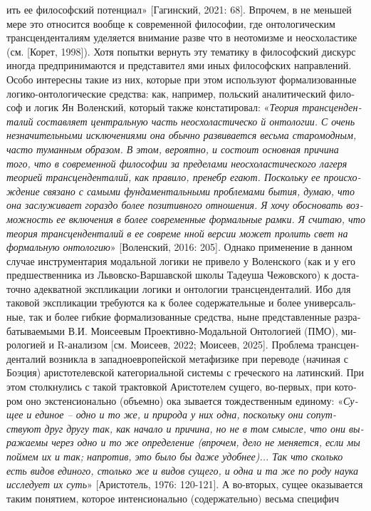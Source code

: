 \begin{russian}
{{    ить ее философский потенциал}» [Гагинский, 2021: 68]. 
    Впрочем, в не меньшей мере это относится вообще к современной философии, где онтологическим трансценденталиям уделяется внимание разве что в неотомизме и неосхоластике (см. [Корет, 1998]). Хотя попытки вернуть эту тематику в философский дискурс иногда предпринимаются и представител
    ями иных философских направлений. 
    Особо интересны такие из них, которые при этом используют формализованные логико-онтологические средства: как, например, польский аналитический философ и логик Ян Воленский, который также констатировал: «\textit{Теория трансценденталий составляет центральную часть неосхоластическо
    й онтологии. С очень незначительными исключениями она обычно развивается весьма старомодным, часто туманным образом. В этом, вероятно, и состоит основная причина того, что в современной философии за пределами неосхоластического лагеря теорией трансценденталий, как правило, пренебр
    егают. Поскольку ее происхождение связано с самыми фундаментальными проблемами бытия, думаю, что она заслуживает гораздо более позитивного отношения. Я хочу обосновать возможность ее включения в более современные формальные рамки. Я считаю, что теория трансценденталий в ее совреме
    нной версии может пролить свет на формальную онтологию}» [Воленский, 2016: 205]. 
    Однако применение в данном случае инструментария модальной логики не привело у Воленского (как и у его предшественника из Львовско-Варшавской школы Тадеуша Чежовского) к достаточно адекватной экспликации логики и онтологии трансценденталий. Ибо для таковой экспликации требуются ка
    к более содержательные и более универсальные, так и более гибкие формализованные средства, ныне представленные разрабатываемыми В.И. Моисеевым Проективно-Модальной Онтологией (ПМО), мирологией и R-анализом [см. Моисеев, 2022; Моисеев, 2025].
    Проблема трансценденталий возникла в западноевропейской метафизике при переводе (начиная с Боэция) аристотелевской категориальной системы с греческого на латинский. При этом столкнулись с такой трактовкой Аристотелем сущего, во-первых, при котором оно экстенсионально (объемно) ока
    зывается тождественным единому: «\textit{Сущее и единое – одно и то же, и природа у них одна, поскольку они сопутствуют друг другу так, как начало и причина, но не в том смысле, что они выражаемы через одно и то же определение (впрочем, дело не меняется, если мы поймем их и так; 
    напротив, это было бы даже удобнее)... Так что сколько есть видов единого, столько же и видов сущего, и одна и та же по роду наука исследует их суть}» [Аристотель, 1976: 120-121]. А во-вторых, сущее оказывается таким понятием, которое интенсионально (содержательно) весьма специфич
}
\end{russian}
